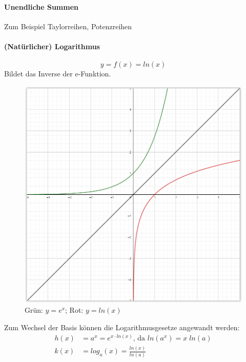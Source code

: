 \documentclass[12pt,a4paper]{article}%
\numberwithin{equation}{section}
\newcommand{\subsubsubsection}{\paragraph}
\numberwithin{equation}{subsection}
\begin{document}
		\subsubsubsection{Unendliche Summen}
		Zum Beispiel Taylorreihen, Potenzreihen
		
		\subsubsubsection{(Natürlicher) Logarithmus}
		\begin{equation}
		  y = f(x) = ln(x)
		\end{equation}
		Bildet das Inverse der e-Funktion. 
		\begin{figure}[H]
		  \centering
		  \includegraphics[width=0.35\linewidth]{funktionen_e_ln.png}
		  \caption{Grün: $y = e^x$; Rot: $y = ln(x)$}
		  \label{fig:funkt_e_ln}
		\end{figure}
		Zum Wechsel der Basis können die Logarithmusgesetze angewandt werden:
		\begin{align}
		  h(x) &= a^x = e^{x \cdot ln(x)} \text{, da } ln(a^x) = x\;ln(a) \nonumber \\
		  k(x) &= log_a(x) = \frac{ln(x)}{ln(a)}
		\end{align}
		
\end{document}
